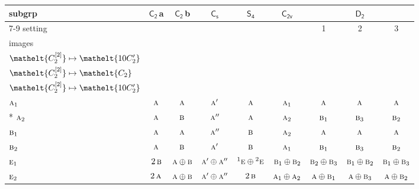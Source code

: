 \documentclass[10pt,a4paper]{article}
\numberwithin{equation}{section}
\newcommand{\eltfont}[1]{{\let\sigma\eltsigma\mathelt{#1}}}
\newcommand{\grp}[1]{\mathsf{#1}}
\newcommand{\irr}[1]{\text{\normalfont\scshape #1}}
\newcommand{\conjpair}[1]{{}^{#1}}
\newcommand{\cls}[1]{\eltfont{#1}}
\newcommand{\clsletter}[1]{\,{\scriptsize\color{black!55}#1}}
\newcommand{\genidx}[2]{#1^{[\mathrm{#2}]}}
\begin{document}
{\small\begin{longtable}{@{}lcccccccc@{}}\toprule
subgrp & \href{C2.pdf}{$\grp{C_{2}}$}\clsletter{a} & \href{C2.pdf}{$\grp{C_{2}}$}\clsletter{b} & \href{C1v.pdf}{$\grp{C_{s}}$} & \href{S4.pdf}{$\grp{S_{4}}$} & \href{C2v.pdf}{$\grp{C_{2v}}$} & \multicolumn{3}{c}{\href{D2.pdf}{$\grp{D_{2}}$}}\\\cmidrule(lr){7-9}
setting &  &  &  &  &  & 1 & 2 & 3\\
images &  &  &  &  &  & {\scriptsize\begin{tabular}[t]{@{}c@{}}$\cls{\genidx{C_{2}}{1}} \mapsto \cls{C_{2}}$\\$\cls{\genidx{C_{2}}{2}} \mapsto \cls{10C_{2}'}$\end{tabular}} & {\scriptsize\begin{tabular}[t]{@{}c@{}}$\cls{\genidx{C_{2}}{1}} \mapsto \cls{10C_{2}'}$\\$\cls{\genidx{C_{2}}{2}} \mapsto \cls{C_{2}}$\end{tabular}} & {\scriptsize\begin{tabular}[t]{@{}c@{}}$\cls{\genidx{C_{2}}{1}} \mapsto \cls{10C_{2}'}$\\$\cls{\genidx{C_{2}}{2}} \mapsto \cls{10C_{2}'}$\end{tabular}}\\\midrule\endhead
\bottomrule\endfoot\endlastfoot
$\irr{a}_{1}$ & $\irr{a}$ & $\irr{a}$ & $\irr{a}'$ & $\irr{a}$ & $\irr{a}_{1}$ & $\irr{a}$ & $\irr{a}$ & $\irr{a}$\\*
$\irr{a}_{2}$ & $\irr{a}$ & $\irr{b}$ & $\irr{a}''$ & $\irr{a}$ & $\irr{a}_{2}$ & $\irr{b}_{1}$ & $\irr{b}_{3}$ & $\irr{b}_{2}$\\
$\irr{b}_{1}$ & $\irr{a}$ & $\irr{a}$ & $\irr{a}''$ & $\irr{b}$ & $\irr{a}_{2}$ & $\irr{a}$ & $\irr{a}$ & $\irr{a}$\\
$\irr{b}_{2}$ & $\irr{a}$ & $\irr{b}$ & $\irr{a}'$ & $\irr{b}$ & $\irr{a}_{1}$ & $\irr{b}_{1}$ & $\irr{b}_{3}$ & $\irr{b}_{2}$\\
$\irr{e}_{1}$ & $2\,\irr{b}$ & $\irr{a}\oplus \irr{b}$ & $\irr{a}'\oplus \irr{a}''$ & $\conjpair{1}\irr{e}\oplus \conjpair{2}\irr{e}$ & $\irr{b}_{1}\oplus \irr{b}_{2}$ & $\irr{b}_{2}\oplus \irr{b}_{3}$ & $\irr{b}_{1}\oplus \irr{b}_{2}$ & $\irr{b}_{1}\oplus \irr{b}_{3}$\\
$\irr{e}_{2}$ & $2\,\irr{a}$ & $\irr{a}\oplus \irr{b}$ & $\irr{a}'\oplus \irr{a}''$ & $2\,\irr{b}$ & $\irr{a}_{1}\oplus \irr{a}_{2}$ & $\irr{a}\oplus \irr{b}_{1}$ & $\irr{a}\oplus \irr{b}_{3}$ & $\irr{a}\oplus \irr{b}_{2}$\\

\end{longtable}}
\end{document}
